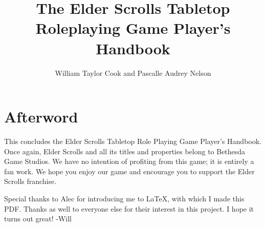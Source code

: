 \documentclass[12pt]{book}
\title{The Elder Scrolls Tabletop Roleplaying Game Player's Handbook}
\author{William Taylor Cook and Pascalle Audrey Nelson}
\begin{document}
\maketitle



\tableofcontents










\chapter*{Afterword}
This concludes the Elder Scrolls Tabletop Role Playing Game Player's Handbook. Once again, Elder Scrolls and all its titles and properties belong to Bethesda Game Studios. We have no intention of profiting from this game; it is entirely a fan work. We hope you enjoy our game and encourage you to support the Elder Scrolls franchise.

Special thanks to Alec for introducing me to LaTeX, with which I made this PDF. Thanks as well to everyone else for their interest in this project. I hope it turns out great! -Will
\end{document}
